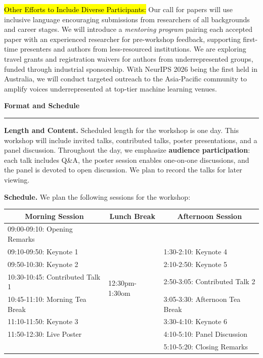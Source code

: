 \documentclass{article}
\newcommand{\sectiontitle}[1]{\noindent\textbf{\textcolor{neuripsblue}{#1}}\vspace{0.1cm}\hrule\vspace{0.2cm}}
\begin{document}
\hl{Other Efforts to Include Diverse Participants:}
Our call for papers will use inclusive language encouraging submissions from researchers of all backgrounds and career stages. We will introduce a \textit{mentoring program} pairing each accepted paper with an experienced researcher for pre-workshop feedback, supporting first-time presenters and authors from less-resourced institutions.
We are exploring travel grants and registration waivers for authors from underrepresented groups, funded through industrial sponsorship.
With NeurIPS 2026 being the first held in Australia, we will conduct targeted outreach to the Asia-Pacific community to amplify voices underrepresented at top-tier machine learning venues.

\sectiontitle{Format and Schedule}
\vspace{-2pt}
\textbf{Length and Content.}
Scheduled length for the workshop is one day. This workshop will include invited talks, contributed talks, poster presentations, and a panel discussion. Throughout the day, we emphasize \textbf{audience participation}: each talk includes Q\&A, the poster session enables one-on-one discussions, and the panel is devoted to open discussion. We plan to record the talks for later viewing. 

\textbf{Schedule.}
We plan the following sessions for the workshop:\\
\begingroup
  \hfill
    \begin{tabular}{l|l|l}
    \toprule
    \multicolumn{1}{c|}{\textbf{Morning Session}}  & \multicolumn{1}{c|}{\textbf{Lunch Break}} & \multicolumn{1}{c}{\textbf{Afternoon Session}}  \\
    \midrule
    09:00-09:10: Opening Remarks &   \multirow{8}{*}{12:30pm-1:30om} &  \\
    09:10-09:50: Keynote 1 & & 1:30-2:10: Keynote 4  \\
    09:50-10:30: Keynote 2 & & 2:10-2:50: Keynote 5  \\
    10:30-10:45: Contributed Talk 1 & & 2:50-3:05: Contributed Talk 2  \\
    10:45-11:10: Morning Tea Break & & 3:05-3:30: Afternoon Tea Break   \\
    11:10-11:50: Keynote 3 & & 3:30-4:10: Keynote 6  \\
    11:50-12:30: Live Poster & & 4:10-5:10: Panel Discussion  \\
     & & 5:10-5:20: Closing Remarks   \\
    \bottomrule
    \end{tabular}%
\hfill
\endgroup
\end{document}
